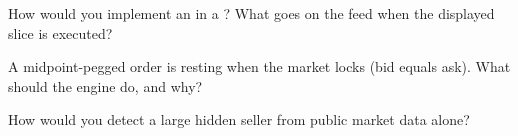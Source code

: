 \begin{interviewq}\label{iq:mx:order-types-and-their-uses:4}
How would you implement an  in a ? What goes on the feed when the displayed slice is executed?
\end{interviewq}

\begin{interviewq}\label{iq:mx:order-types-and-their-uses:5}
A midpoint-pegged order is resting when the market locks (bid equals ask). What should the engine do, and why?
\end{interviewq}

\begin{interviewq}\label{iq:mx:order-types-and-their-uses:6}
How would you detect a large hidden seller from public market data alone?
\end{interviewq}
